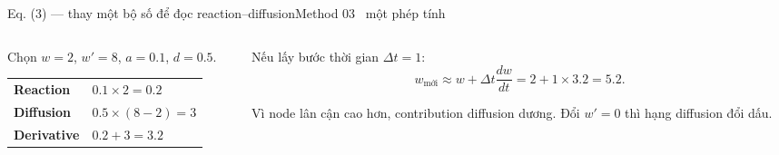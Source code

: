 \begin{frame}[shrink=24]{Eq. (3) --- thay một bộ số để đọc reaction--diffusion}{Method 03 \textperiodcentered\ một phép tính}
\vspace{3mm}
\begin{columns}[T,onlytextwidth]
\begin{column}{0.50\textwidth}
\begin{intuition}
  Chọn $w=2$, $w'=8$, $a=0.1$, $d=0.5$.\\[2mm]
  \begin{tabular}{ll}
    \textbf{Reaction} & $0.1\times2=0.2$\\
    \textbf{Diffusion} & $0.5\times(8-2)=3$\\
    \textbf{Derivative} & $0.2+3=3.2$
  \end{tabular}
\end{intuition}
\end{column}
\begin{column}{0.46\textwidth}
\begin{mathcard}
  Nếu lấy bước thời gian $\Delta t=1$:
  \[w_{\text{mới}}\approx w+\Delta t\frac{dw}{dt}=2+1\times3.2=5.2.\]
\end{mathcard}
\vspace{3mm}
\begin{takeaway}
  Vì node lân cận cao hơn, contribution diffusion dương. Đổi $w'=0$ thì hạng diffusion đổi dấu.
\end{takeaway}
\end{column}
\end{columns}
\vspace{2mm}
\end{frame}

